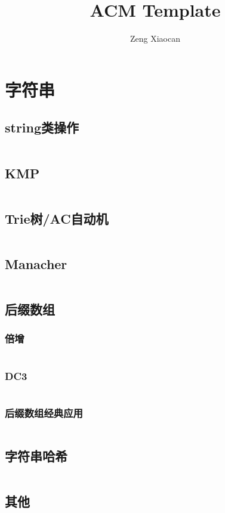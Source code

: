 \documentclass[a4paper,9pt]{article}
\author{Zeng Xiaocan}
\title{ACM Template}
\begin{document}
 
\maketitle %
\newpage %
\tableofcontents %
\newpage
\section{字符串}
\subsection{string类操作}
\inputminted[]{c++}{Template/String/STL.cpp}
\subsection{KMP}
\inputminted[]{c++}{Template/String/KMP.cpp}
\subsection{Trie树/AC自动机}
\inputminted[]{c++}{Template/String/TrieAC.cpp}
\subsection{Manacher}
\inputminted[]{c++}{Template/String/Manacher.cpp}
\subsection{后缀数组}
\subsubsection{倍增}
\inputminted[]{c++}{Template/String/Suffix-Array.cpp}
\subsubsection{DC3}
\inputminted[]{c++}{Template/String/Suffix-Array-DC3.cpp}
\subsubsection{后缀数组经典应用}
\inputminted[]{c++}{Template/String/SA-usage.cpp}
\subsection{字符串哈希}
\inputminted[]{c++}{Template/String/Hash.cpp}
\subsection{其他}
\end{document}
